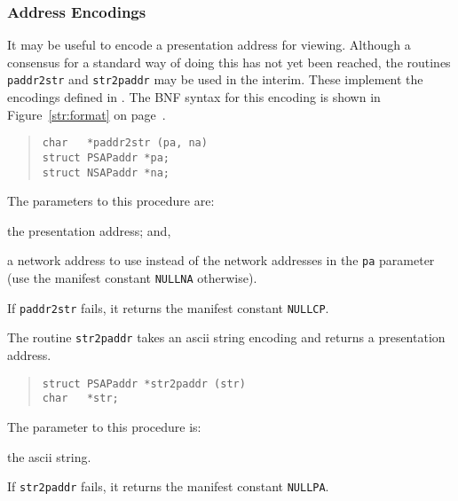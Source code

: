 \subsubsection	{Address Encodings}\label{addr:encodings}
It may be useful to encode a presentation address for viewing.
Although a consensus for a standard way of doing this has not yet been
reached,
the routines \verb"paddr2str" and \verb"str2paddr" may be used in the interim.
These implement the encodings defined in \cite{String.Addresses}.
The BNF syntax for this encoding is shown in Figure~\ref{str:format} on
page~\pageref{str:format}.
\begin{quote}\small\begin{verbatim}
char   *paddr2str (pa, na)
struct PSAPaddr *pa;
struct NSAPaddr *na;
\end{verbatim}\end{quote}
The parameters to this procedure are:
\begin{describe}
\item[\verb"pa":] the presentation address;
and,

\item[\verb"na":] a network address to use instead of the network addresses
in the \verb"pa" parameter
(use the manifest constant \verb"NULLNA" otherwise).
\end{describe}
If \verb"paddr2str" fails,
it returns the manifest constant \verb"NULLCP".

The routine \verb"str2paddr" takes an ascii string encoding and
returns a
presentation address.
\begin{quote}\small\begin{verbatim}
struct PSAPaddr *str2paddr (str)
char   *str;
\end{verbatim}\end{quote}
The parameter to this procedure is:
\begin{describe}
\item[\verb"str":] the ascii string.
\end{describe}
If \verb"str2paddr" fails,
it returns the manifest constant \verb"NULLPA".
\empty

